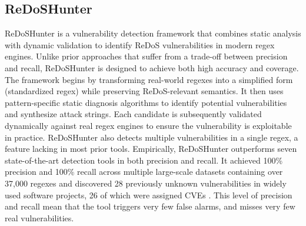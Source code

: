\subsection{ReDoSHunter}
ReDoSHunter is a vulnerability detection framework that combines static analysis with dynamic validation to identify ReDoS vulnerabilities in modern regex engines. Unlike prior approaches that suffer from a trade-off between precision and recall, ReDoSHunter is designed to achieve both high accuracy and coverage.
The framework begins by transforming real-world regexes into a simplified form (standardized regex) while preserving ReDoS-relevant semantics. It then uses pattern-specific static diagnosis algorithms to identify potential vulnerabilities and synthesize attack strings. Each candidate is subsequently validated dynamically against real regex engines to ensure the vulnerability is exploitable in practice. ReDoSHunter also detects multiple vulnerabilities in a single regex, a feature lacking in most prior tools.
Empirically, ReDoSHunter outperforms seven state-of-the-art detection tools in both precision and recall. It achieved 100\% precision and 100\% recall across multiple large-scale datasets containing over 37,000 regexes and discovered 28 previously unknown vulnerabilities in widely used software projects, 26 of which were assigned CVEs \cite{redoshunter_paper}.
This level of precision and recall mean that the tool triggers very few false alarms, and misses very few real vulnerabilities.

